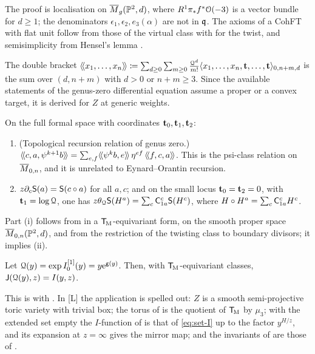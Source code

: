 The proof is localisation on $\overline{M}_g(\mathbb{P}^2,d)$, where $R^1\pi_*f^*\mathcal{O}(-3)$ is a vector bundle for $d\geq1$; the denominators $\epsilon_1,\epsilon_2,e_3(\alpha)$ are not in $\mathfrak{q}$. The axioms of a CohFT with flat unit follow from those of the virtual class with \cite[App.~1 (iv)--(vi)]{CG07} for the twist, and semisimplicity from Hensel's lemma .

The double bracket $\langle\!\langle x_1,\dots,x_n \rangle\!\rangle\coloneqq\sum_{d\geq0}\sum_{m\geq0}\frac{\mathcal{Q}^d}{m!}\langle x_1,\dots,x_n,\mathbf{t},\dots,\mathbf{t}\rangle_{0,n+m,d}$ is the sum over $(d,n+m)$ with $d>0$ or $n+m\geq3$. Since the available statements of the genus-zero differential equation assume a proper or a convex target, it is derived for $Z$ at generic weights.

\begin{prop}
\label{prop:gen-qde}
On the full formal space with coordinates $\mathbf{t}_0,\mathbf{t}_1,\mathbf{t}_2$:
\begin{enumerate}
\item \textup{(Topological recursion relation of genus zero.)} $\langle\!\langle c,a,\psi^{k+1}b \rangle\!\rangle=\sum_{e,f}\langle\!\langle \psi^kb,e \rangle\!\rangle\,\eta^{ef}\,\langle\!\langle f,c,a \rangle\!\rangle$. This is the psi-class relation on $\overline{M}_{0,n}$, and it is unrelated to Eynard--Orantin recursion.
\item $z\partial_c\mathsf{S}(a)=\mathsf{S}(c\circ a)$ for all $a,c$; and on the small locus $\mathbf{t}_0=\mathbf{t}_2=0$, with $\mathbf{t}_1=\log\mathcal{Q}$, one has $z\theta_{\mathcal{Q}}\mathsf{S}(H^a)=\sum_c\mathsf{C}^c_{1a}\mathsf{S}(H^c)$, where $H\circ H^a=\sum_c\mathsf{C}^c_{1a}H^c$.
\end{enumerate}
\end{prop}

Part (i) follows from \cite[Lemma 1]{Pan98} in a $\mathsf{T}_{\!\mathrm{M}}$-equivariant form, on the smooth proper space $\overline{M}_{0,n}(\mathbb{P}^2,d)$, and from the restriction of the twisting class to boundary divisors; it implies (ii).

\begin{thm}
\label{thm:gen-mirror}
Let $\mathcal{Q}(y)=\exp I_0^{[1]}(y)=y\mathrm{e}^{\mathsf{g}(y)}$. Then, with $\mathsf{T}_{\!\mathrm{M}}$-equivariant classes, $\mathsf{J}(\mathcal{Q}(y),z)=I(y,z)$.
\end{thm}

This is \cite[Theorem 31]{CCIT15} with \cite[Definition 28, eq.~(19), eq.~(4), Remark 3]{CCIT15}. In \textup{[L]} the application is spelled out: $Z$ is a smooth semi-projective toric variety with trivial box; the torus of \cite{CCIT15} is the quotient of $\mathsf{T}_{\!\mathrm{M}}$ by $\mu_3$; with the extended set empty the $I$-function of \cite{CCIT15} is that of \eqref{eq:set-I} up to the factor $y^{H/z}$, and its expansion at $z=\infty$ gives the mirror map; and the invariants of \cite{CCIT15} are those of \cite{BS}.


